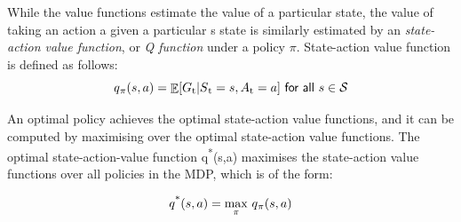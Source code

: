 \documentclass[11pt,twoside]{report}
\theoremstyle{plain}
\theoremstyle{definition}
\DeclareMathOperator{\E}{\mathbb{E}}
\newtheorem{examp}{Example}[section]
\begin{document}
While the value functions estimate the value of  a particular state, the value of taking an action a given a particular s state is similarly estimated by an \textit{state-action value function}, or \textit{Q function} under a policy $\pi$. State-action value function is defined as follows: 
\begin{equation}
q\textsubscript{$\pi$}(s, a) = \displaystyle \E [G\textsubscript{t} \vert S\textsubscript{t} = s, A\textsubscript{t} = a] \ \textsf{for all}\ s \in \mathcal{S}
\end{equation}

An optimal policy achieves the optimal state-action value functions, and it can be computed by maximising over the optimal state-action value functions.
The optimal state-action-value function q\textsuperscript{*}(s,a) maximises the state-action value functions over all policies in the MDP, which is of the form:

\begin{equation}
q\textsuperscript{*}(s, a) = \underset{\pi}{\max} \ q\textsubscript{$\pi$}(s, a)
\end{equation}






%
%
%
%
\end{document}
